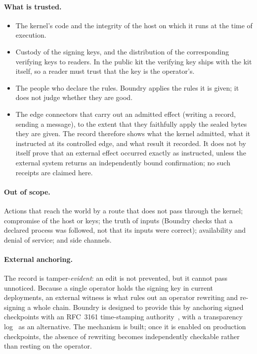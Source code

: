 \documentclass[11pt,a4paper]{article}
\begin{document}
\paragraph{What is trusted.}
\begin{itemize}
  \item The kernel's code and the integrity of the host on which it runs at the time of execution.
  \item Custody of the signing keys, and the distribution of the corresponding verifying keys to readers. In the public kit the verifying key ships with the kit itself, so a reader must trust that the key is the operator's.
  \item The people who declare the rules. Boundry applies the rules it is given; it does not judge whether they are good.
  \item The edge connectors that carry out an admitted effect (writing a record, sending a message), to the extent that they faithfully apply the sealed bytes they are given. The record therefore shows what the kernel admitted, what it instructed at its controlled edge, and what result it recorded. It does not by itself prove that an external effect occurred exactly as instructed, unless the external system returns an independently bound confirmation; no such receipts are claimed here.
\end{itemize}

\paragraph{Out of scope.} Actions that reach the world by a route that does not pass through the kernel; compromise of the host or keys; the truth of inputs (Boundry checks that a declared process was followed, not that its inputs were correct); availability and denial of service; and side channels.

\paragraph{External anchoring.} The record is tamper-\emph{evident}: an edit is not prevented, but it cannot pass unnoticed. Because a single operator holds the signing key in current deployments, an external witness is what rules out an operator rewriting and re-signing a whole chain. Boundry is designed to provide this by anchoring signed checkpoints with an RFC~3161 time-stamping authority~\citep{rfc3161}, with a transparency log~\citep{rfc9162} as an alternative. The mechanism is built; once it is enabled on production checkpoints, the absence of rewriting becomes independently checkable rather than resting on the operator.
\end{document}
